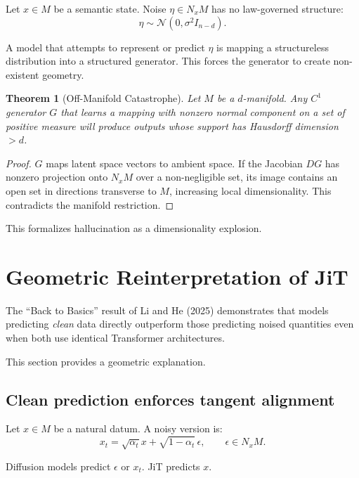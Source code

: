 \documentclass[11pt,a4paper,twocolumn]{article}
\newtheorem{theorem}{Theorem}[section]
\begin{document}
Let $x \in M$ be a semantic state. Noise $\eta \in N_x M$ has no
law-governed structure:
\[
\eta \sim \mathcal{N}(0,\sigma^2 I_{n-d}).
\]

A model that attempts to represent or predict $\eta$ is mapping a
structureless distribution into a structured generator.  
This forces the generator to create non-existent geometry.

\begin{theorem}[Off-Manifold Catastrophe]
Let $M$ be a $d$-manifold. Any $C^1$ generator $G$ that learns a mapping
with nonzero normal component on a set of positive measure will produce
outputs whose support has Hausdorff dimension $> d$.
\end{theorem}

\begin{proof}
$G$ maps latent space vectors to ambient space.  
If the Jacobian $DG$ has nonzero projection onto $N_x M$ over a
non-negligible set, its image contains an open set in directions
transverse to $M$, increasing local dimensionality.  
This contradicts the manifold restriction.
\end{proof}

This formalizes hallucination as a dimensionality explosion.


\section{Geometric Reinterpretation of JiT}

The ``Back to Basics'' result of Li and He (2025) demonstrates that
models predicting \emph{clean} data directly outperform those predicting 
noised quantities even when both use identical Transformer architectures.

This section provides a geometric explanation.

\subsection{Clean prediction enforces tangent alignment}

Let $x \in M$ be a natural datum.  
A noisy version is:
\[
x_t = \sqrt{\alpha_t} x + \sqrt{1 - \alpha_t} \,\epsilon,
\qquad \epsilon \in N_x M.
\]

Diffusion models predict $\epsilon$ or $x_t$.  
JiT predicts $x$.
\end{document}
